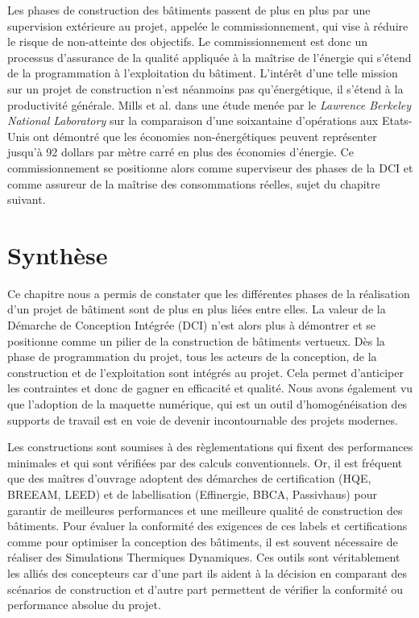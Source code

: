 Les phases de construction des bâtiments passent de plus en plus par une supervision extérieure au projet, appelée le commissionnement, qui vise à réduire le risque de non-atteinte des objectifs. Le commissionnement est donc un processus d'assurance de la qualité appliquée à la maîtrise de l'énergie qui s'étend de la programmation à l'exploitation du bâtiment. L'intérêt d'une telle mission sur un projet de construction n'est néanmoins pas qu'énergétique, il s'étend à la productivité générale. Mills et al. \cite{Mills-04} dans une étude menée par le \textit{Lawrence Berkeley National Laboratory} sur la comparaison d'une soixantaine d'opérations aux Etats-Unis ont démontré que les économies non-énergétiques peuvent représenter jusqu'à 92 dollars par mètre carré en plus des économies d'énergie. Ce commissionnement se positionne alors comme superviseur des phases de la DCI et comme assureur de la maîtrise des consommations réelles, sujet du chapitre suivant.

\section{Synthèse}

Ce chapitre nous a permis de constater que les différentes phases de la réalisation d'un projet de bâtiment sont de plus en plus liées entre elles. La valeur de la Démarche de Conception Intégrée (DCI) n'est alors plus à démontrer et se positionne comme un pilier de la construction de bâtiments vertueux. Dès la phase de programmation du projet, tous les acteurs de la conception, de la construction et de l'exploitation sont intégrés au projet. Cela permet d'anticiper les contraintes et donc de gagner en efficacité et qualité. Nous avons également vu que l'adoption de la maquette numérique, qui est un outil d'homogénéisation des supports de travail est en voie de devenir incontournable des projets modernes.

Les constructions sont soumises à des règlementations qui fixent des performances minimales et qui sont vérifiées par des calculs conventionnels. Or, il est fréquent que des maîtres d'ouvrage adoptent des démarches de certification (HQE, BREEAM, LEED) et de labellisation (Effinergie, BBCA, Passivhaus) pour garantir de meilleures performances et une meilleure qualité de construction des bâtiments. Pour évaluer la conformité des exigences de ces labels et certifications comme pour optimiser la conception des bâtiments, il est souvent nécessaire de réaliser des Simulations Thermiques Dynamiques. Ces outils sont véritablement les alliés des concepteurs car d'une part ils aident à la décision en comparant des scénarios de construction et d'autre part permettent de vérifier la conformité ou performance absolue du projet.

